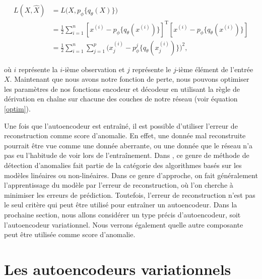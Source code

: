 \begin{equation*} \label{perte1}
\begin{split}
L(X,\hat{X}) & = L\big(X, p_\phi\{q_\theta(X)\}\big) \\
& = \frac{1}{2} \sum_{i=1}^{n} [x^{(i)}-p_\phi\{q_\theta(x^{(i)})\}]^{\text{T}}[x^{(i)}-p_\phi\{q_\theta(x^{(i)})\}] \\
& = \frac{1}{2} \sum_{i=1}^{n} \sum_{j=1}^{p} \big(x_{j}^{(i)}-p^j_\phi\{q_\theta(x_{j}^{(i)})\}\big)^2,
\end{split}
\end{equation*}

où $i$ représente la $i$-ième observation et $j$ représente le $j$-ième élément de l'entrée $X$. Maintenant que nous avons notre fonction de perte, nous pouvons optimiser les paramètres de nos fonctions encodeur et décodeur en utilisant la règle de dérivation en chaîne sur chacune des couches de notre réseau (voir équation \ref{optim}).

Une fois que l'autoencodeur est entraîné, il est possible d'utiliser l'erreur de reconstruction comme score d'anomalie. En effet, une donnée mal reconstruite pourrait être vue comme une donnée aberrante, ou une donnée que le réseau n'a pas eu l'habitude de voir lors de l'entraînement. Dans  \cite{10.5555/3086742}, ce genre de méthode de détection d'anomalies fait partie de la catégorie des algorithmes basés sur les modèles linéaires ou non-linéaires. Dans ce genre d'approche, on fait généralement l'apprentissage du modèle par l'erreur de reconstruction, où l'on cherche à minimiser les erreurs de prédiction. Toutefois, l'erreur de reconstruction n'est pas le seul critère qui peut être utilisé pour entraîner un autoencodeur. Dans la prochaine section, nous allons considérer un type précis d'autoencodeur, soit l'autoencodeur variationnel. Nous verrons également quelle autre composante peut être utilisée comme score d'anomalie.

\section{Les autoencodeurs variationnels} \label{background-vae}

